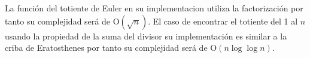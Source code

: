 La función del totiente de Euler en su implementacion utiliza la factorización por tanto su complejidad será de O$(\sqrt{n})$. El caso de encontrar el totiente del 1 al $n$ usando la propiedad de la suma del divisor su implementación es similar a la criba de Eratosthenes por tanto su complejidad será de O$(n \log\log{n})$.
